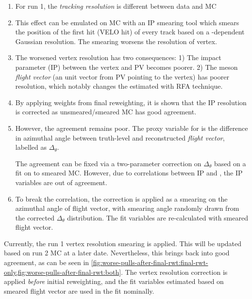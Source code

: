 \begin{enumerate}
    \item For run 1, the \emph{tracking resolution} is different between data
        and MC
    \item This effect can be emulated on MC with an IP smearing tool which
        smears the position of the first hit (VELO hit) of every track based on
        a \pt-dependent Gaussian resolution.
        The smearing worsens the resolution of \B vertex.
    \item The worsened \B vertex resolution has two consequences:
        1) The impact parameter (IP) between the \B vertex and PV becomes
        poorer.
        2) The \B meson \emph{flight vector}
        (an unit vector from PV pointing to the \B vertex) has poorer
        resolution,
        which notably changes the estimated \mmSq with RFA technique.
    \item By applying weights from final reweighting, it is shown that
        the IP resolution is corrected as unsmeared/smeared
        MC has good agreement.
    \item However, the \mmSq agreement remains poor.
        The proxy variable for \mmSq is the difference in azimuthal angle
        between truth-level and reconstructed \emph{flight vector},
        labelled as $\Delta_\theta$.

        The agreement can be fixed via a two-parameter correction on
        $\Delta_\theta$ based on a fit on \mmSq to smeared MC.
        However, due to correlations between IP and \mmSq, the IP variables are
        out of agreement.
    \item To break the correlation,
        the correction is applied as a smearing on the azimuthal angle of \B
        flight vector, with smearing angle randomly drawn from
        the corrected $\Delta_\theta$ distribution.
        The fit variables are re-calculated with smeared flight vector.
\end{enumerate}

Currently, the run 1 vertex resolution smearing is applied.
This will be updated based on run 2 MC at a later date.
Nevertheless, this brings \mmSq back into good agreement, as can be seen in
\cref{fig:worse-pulls-after-final-rwt:final-rwt-only,fig:worse-pulls-after-final-rwt:both}.
The vertex resolution correction is applied \emph{before} initial reweighting,
and the fit variables estimated based on smeared flight vector are used
in the fit nominally.


